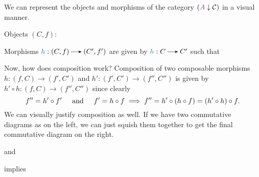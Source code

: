     We can represent the objects and morphisms of the
    category $(\textcolor{Purple}{A} \downarrow \cc)$ in a visual manner. 
    \begin{center}
        Objects $(C, f)$:
        \hspace{1cm}
        \parbox{6cm}{Morphisms $\textcolor{NavyBlue}{h}: (C, f) \to (C', f')$
        are given by $\textcolor{NavyBlue}{h}: C \to C'$ such that}
    \end{center}
    Now, how does composition work?
    Composition of two composable morphisms $h : (f, C) \to
    (f', C')$ and $h' : (f', C') \to (f'', C'')$ is given by 
    $h' \circ h : (f, C) \to (f'', C'')$ since clearly 
    \[
        f'' = h' \circ f' \hspace{0.5cm}\text{and}\hspace{0.5cm} f' = h \circ f \implies f'' = h' \circ (h \circ f) = (h' \circ h) \circ f.
    \]  
    We can visually justify composition as well. If we have two commutative diagrams 
    as on the left, we can just squish them together to get the final commutative diagram on the right. 
    \begin{center}
        and 
        implies
    \end{center}

